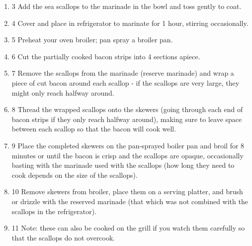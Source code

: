 \documentclass[11pt, twoside, openany]{book}
\begin{document}
\begin{minipage}[t]{\linewidth}
\begin{enumerate}
\item 3 Add the sea scallops to the marinade in the bowl and toss gently to coat. 
\item 4 Cover and place in refrigerator to marinate for 1 hour, stirring occasionally. 
\item 5 Preheat your oven broiler; pan spray a broiler pan. 
\item 6 Cut the partially cooked bacon strips into 4 sections apiece. 
\item 7 Remove the scallops from the marinade (reserve marinade) and wrap a piece of cut bacon around each scallop - if the scallops are very large, they might only reach halfway around. 
\item 8 Thread the wrapped scallops onto the skewers (going through each end of bacon strips if they only reach halfway around), making sure to leave space between each scallop so that the bacon will cook well. 
\item 9 Place the completed skewers on the pan-sprayed boiler pan and broil for 8 minutes or until the bacon is crisp and the scallops are opaque, occasionally basting with the marinade used with the scallops (how long they need to cook depends on the size of the scallops). 
\item 10 Remove skewers from broiler, place them on a serving platter, and brush or drizzle with the reserved marinade (that which was not combined with the scallops in the refrigerator). 
\item 11 Note: these can also be cooked on the grill if you watch them carefully so that the scallops do not overcook.
\end{enumerate}
\end{minipage}\vspace{8mm}
\end{document}
